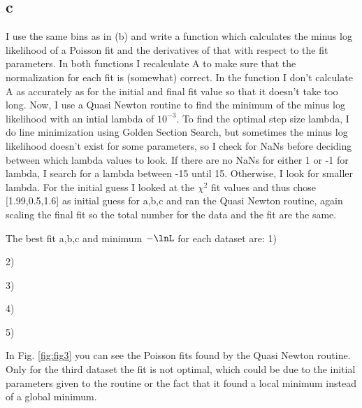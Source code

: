 {\subsection*{c}

I use the same bins as in (b) and write a function which calculates the minus log likelihood of a Poisson fit and the derivatives of that with respect to the fit parameters. In both functions I recalculate A to make sure that the normalization for each fit is (somewhat) correct. In the function I don't calculate A as accurately as for the initial and final fit value so that it doesn't take too long. 
Now, I use a Quasi Newton routine to find the minimum of the minus log likelihood with an intial lambda of $10^{-3}$. To find the optimal step size lambda, I do line minimization using Golden Section Search, but sometimes the minus log likelihood doesn't exist for some parameters, so I check for NaNs before deciding between which lambda values to look. If there are no NaNs for either 1 or -1 for lambda, I search for a lambda between -15 until 15. Otherwise, I look for smaller lambda. 
For the initial guess I looked at the $\chi^2$ fit values and thus chose [1.99,0.5,1.6] as initial guess for a,b,c and ran the Quasi Newton routine, again scaling the final fit so the total number for the data and the fit are the same.

The best fit a,b,c and minimum $-\lnL$ for each dataset are: 1)

2)

3)

4)

5)



In Fig. \ref{fig:fig3} you can see the Poisson fits found by the Quasi Newton routine. Only for the third dataset the fit is not optimal, which could be due to the initial parameters given to the routine or the fact that it found a local minimum instead of a global minimum. 

}
